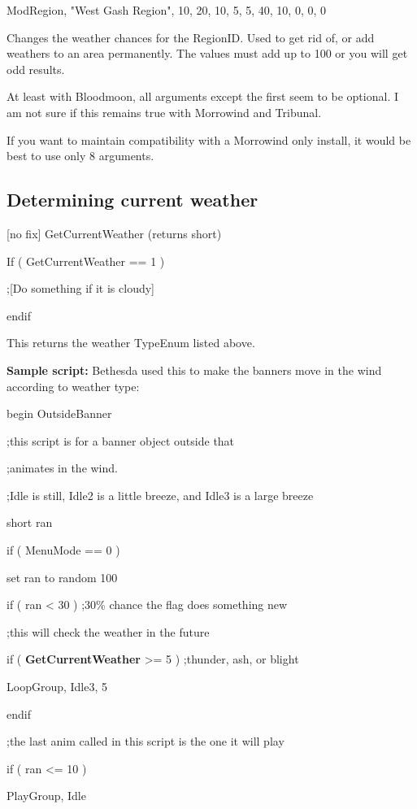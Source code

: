 \documentclass[
]{article}
\begin{document}
ModRegion, "West Gash Region", 10, 20, 10, 5, 5, 40, 10, 0, 0, 0

Changes the weather chances for the RegionID. Used to get rid of, or add
weathers to an area permanently. The values must add up to 100 or you
will get odd results.

At least with Bloodmoon, all arguments except the first seem to be
optional. I am not sure if this remains true with Morrowind and
Tribunal.

If you want to maintain compatibility with a Morrowind only install, it
would be best to use only 8 arguments.

\hypertarget{determining-current-weather}{%
\subsection{Determining current
weather}\label{determining-current-weather}}

{[}no fix{]} GetCurrentWeather (returns short)

If ( GetCurrentWeather == 1 )

;{[}Do something if it is cloudy{]}

endif

This returns the weather TypeEnum listed above.

\textbf{Sample script:} Bethesda used this to make the banners move in
the wind according to weather type:

begin OutsideBanner

;this script is for a banner object outside that

;animates in the wind.

;Idle is still, Idle2 is a little breeze, and Idle3 is a large breeze

short ran

if ( MenuMode == 0 )

set ran to random 100

if ( ran \textless{} 30 ) ;30\% chance the flag does something new

;this will check the weather in the future

if ( \textbf{GetCurrentWeather} \textgreater= 5 ) ;thunder, ash, or
blight

LoopGroup, Idle3, 5

endif

;the last anim called in this script is the one it will play

if ( ran \textless= 10 )

PlayGroup, Idle
\end{document}
